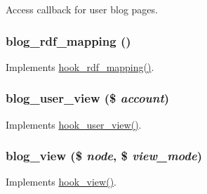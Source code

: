 \label{blog_8module_a213af875712242031b407a11e973e1db}
Access callback for user blog pages. \hypertarget{blog_8module_a8917f4ec69b9f23320607e0f3310f1db}{
\subsubsection[{blog\_\-rdf\_\-mapping}]{\setlength{\rightskip}{0pt plus 5cm}blog\_\-rdf\_\-mapping ()}}
\label{blog_8module_a8917f4ec69b9f23320607e0f3310f1db}
Implements \hyperlink{group__rdf_gae3e7f047bdcb9309b323e2af09966765}{hook\_\-rdf\_\-mapping()}. \hypertarget{blog_8module_a12331d194dce2c5dfe857ca337ce14fe}{
\subsubsection[{blog\_\-user\_\-view}]{\setlength{\rightskip}{0pt plus 5cm}blog\_\-user\_\-view (\$ {\em account})}}
\label{blog_8module_a12331d194dce2c5dfe857ca337ce14fe}
Implements \hyperlink{group__hooks_gaafb9e35d1f82a33918437ad7acf29541}{hook\_\-user\_\-view()}. \hypertarget{blog_8module_a4c2d452795896133f48078e93f06260d}{
\subsubsection[{blog\_\-view}]{\setlength{\rightskip}{0pt plus 5cm}blog\_\-view (\$ {\em node}, \/  \$ {\em view\_\-mode})}}
\label{blog_8module_a4c2d452795896133f48078e93f06260d}
Implements \hyperlink{group__node__api__hooks_gab1f229603b5e0f2f9d9e2a3ab53dcbda}{hook\_\-view()}. 